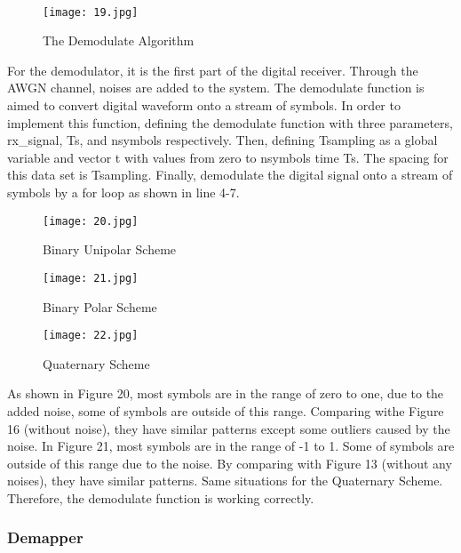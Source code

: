 \documentclass[12pt]{article}
\begin{document}
    \paragraph{}
    \begin{figure}[H]
    \centering
    \texttt{[image: 19.jpg]}
    \caption{The Demodulate Algorithm}
    \end{figure}
    For the demodulator, it is the first part of the digital receiver. Through the AWGN channel, noises are added to the system. The demodulate function is aimed to convert digital waveform onto a stream of symbols. In order to implement this function, defining the demodulate function with three parameters, rx\_signal, Ts, and nsymbols respectively. Then, defining Tsampling as a global variable and vector t with values from zero to nsymbols time Ts. The spacing for this data set is Tsampling. Finally, demodulate the digital signal onto a stream of symbols by a for loop as shown in line 4-7.
    \begin{figure}[htbp]
    \begin{minipage}[t]{0.3\linewidth}
    \centering
    \texttt{[image: 20.jpg]}
    \caption{Binary Unipolar Scheme}
    \label{fig:side:a}
    \end{minipage}
    \begin{minipage}[t]{0.3\linewidth}
    \centering
    \texttt{[image: 21.jpg]}
    \caption{Binary Polar Scheme}
    \end{minipage}
    \begin{minipage}[t]{0.3\linewidth}
    \centering
    \texttt{[image: 22.jpg]}
    \caption{Quaternary Scheme}
    \label{}
    \end{minipage}
    \end{figure}
    As shown in Figure 20, most symbols are in the range of zero to one, due to the added noise, some of symbols are outside of this range. Comparing withe Figure 16 (without noise), they have similar patterns except some outliers caused by the noise. In Figure 21, most symbols are in the range of -1 to 1. Some of symbols are outside of this range due to the noise. By comparing with Figure 13 (without any noises), they have similar patterns. Same situations for the Quaternary Scheme. Therefore, the demodulate function is working correctly.
    
    
    
    
    \subsubsection{Demapper}
\end{document}
